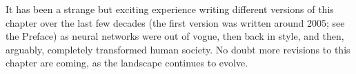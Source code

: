 It has been a strange but exciting experience writing different versions of this chapter over the last few decades (the first version was written around 2005; see the Preface) as neural networks were out of vogue, then back in style, and then, arguably, completely transformed human society. No doubt more revisions to this chapter are coming, as the landscape continues to evolve.

